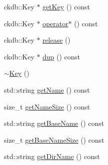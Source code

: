 \begin{DoxyCompactItemize}
ckdb\-::\-Key $\ast$ \hyperlink{classkdb_1_1Key_ae81381365a7c159f070e74a7b7bd8688}{get\-Key} () const 
\item 
ckdb\-::\-Key $\ast$ \hyperlink{classkdb_1_1Key_a6e0dd36c31cc7c46ee1cda0decc6e884}{operator$\ast$} () const 
\begin{DoxyCompactList}\small\item\em \end{DoxyCompactList}\item 
ckdb\-::\-Key $\ast$ \hyperlink{classkdb_1_1Key_a9ae719043e6e99f5f3d6fb85837306f8}{release} ()
\item 
ckdb\-::\-Key $\ast$ \hyperlink{classkdb_1_1Key_a43a1f28d7a0d40f0ded8473d480931ff}{dup} () const 
\begin{DoxyCompactList}\small\item\em \end{DoxyCompactList}\item 
\hyperlink{classkdb_1_1Key_a35dd6ae58d125a298e30aed13b15c1f4}{$\sim$\-Key} ()
\begin{DoxyCompactList}\small\item\em \end{DoxyCompactList}\item 
std\-::string \hyperlink{classkdb_1_1Key_aa3903afe9a4b7aebf427a74612a803cd}{get\-Name} () const 
\begin{DoxyCompactList}\small\item\em \end{DoxyCompactList}\item 
size\-\_\-t \hyperlink{classkdb_1_1Key_aadae92b0d90f39c8b7b6e7f39fa63bfe}{get\-Name\-Size} () const 
\begin{DoxyCompactList}\small\item\em \end{DoxyCompactList}\item 
std\-::string \hyperlink{classkdb_1_1Key_a43d3efd13e01624c520346a19984750b}{get\-Base\-Name} () const 
\begin{DoxyCompactList}\small\item\em \end{DoxyCompactList}\item 
size\-\_\-t \hyperlink{classkdb_1_1Key_a125a90a1cb84d25972896d80af458932}{get\-Base\-Name\-Size} () const 
\begin{DoxyCompactList}\small\item\em \end{DoxyCompactList}\item 
std\-::string \hyperlink{classkdb_1_1Key_acac95fce9ab102d35a4b6e773a7e949a}{get\-Dir\-Name} () const 

\end{DoxyCompactItemize}
